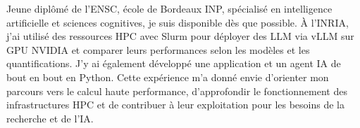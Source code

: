 
\begin{cvparagraph}
Jeune diplômé de l’ENSC, école de Bordeaux INP, spécialisé en intelligence artificielle et sciences cognitives, je suis disponible dès que possible. À l’INRIA, j’ai utilisé des ressources HPC avec Slurm pour déployer des LLM via vLLM sur GPU NVIDIA et comparer leurs performances selon les modèles et les quantifications. J’y ai également développé une application et un agent IA de bout en bout en Python. Cette expérience m’a donné envie d’orienter mon parcours vers le calcul haute performance, d’approfondir le fonctionnement des infrastructures HPC et de contribuer à leur exploitation pour les besoins de la recherche et de l’IA.
\end{cvparagraph}
